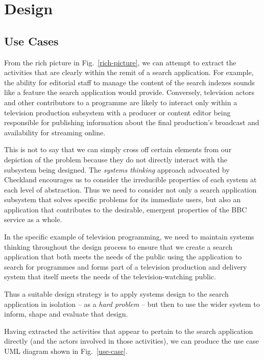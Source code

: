 \documentclass[oribibl]{llncs}
\begin{document}
\section{Design}
\label{design}

\subsection{Use Cases}

From the rich picture in Fig.~\ref{rich-picture}, we can attempt to
extract the activities that are clearly within the remit of a search
application. For example, the ability for editorial staff to manage
the content of the search indexes sounds like a feature the search
application would provide. Conversely, television actors and other
contributors to a programme are likely to interact only within a television
production subsystem with a producer or content editor being responsible
for publishing information about the final production's broadcast and
availability for streaming online.

This is not to say that we can simply cross off certain elements from
our depiction of the problem because they do not directly interact
with the subsystem being designed. The \emph{systems thinking} approach
advocated by Checkland \citep{checkland1999systems} encourages us to
consider the irreducible properties of each system at each level
of abstraction. Thus we need to consider not only a search application
subsystem that solves specific problems for its immediate users, but
also an application that contributes to the desirable, emergent
properties of the BBC service as a whole.

In the specific example of television programming, we need to maintain
systems thinking throughout the design process to ensure that we
create a search application that both meets the needs of the public
using the application to search for programmes and forms part of
a television production and delivery system that itself meets the
needs of the television-watching public.

Thus a suitable design strategy is to apply systems design to
the search application in isolation -- as a \emph{hard problem} --
but then to use the wider system to inform, shape and evaluate that design.

Having extracted the activities that appear to pertain to the
search application directly (and the actors involved in those activities),
we can produce the use case UML diagram shown in Fig.~\ref{use-case}.
\end{document}
